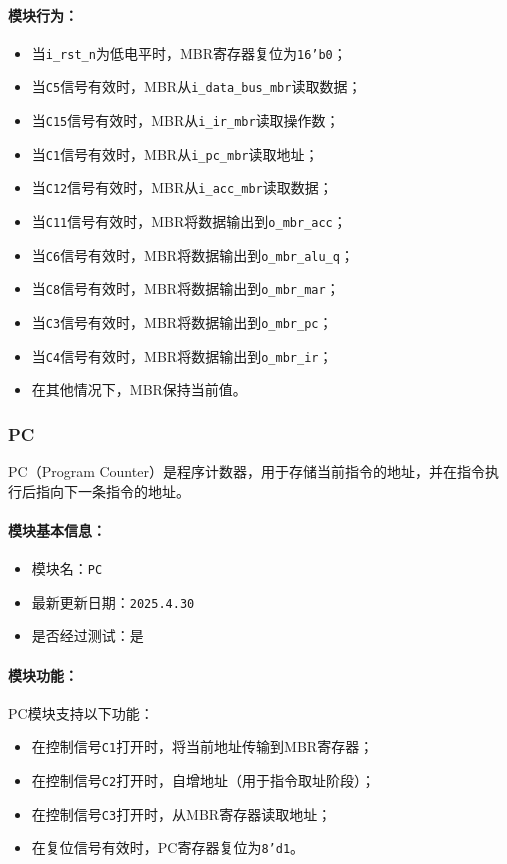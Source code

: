 \documentclass[lang=cn,a4paper,newtx]{elegantpaper}
\begin{document}
\paragraph{模块行为：}
\begin{itemize}
  \item 当\texttt{i\_rst\_n}为低电平时，MBR寄存器复位为\texttt{16'b0}；
  \item 当\texttt{C5}信号有效时，MBR从\texttt{i\_data\_bus\_mbr}读取数据；
  \item 当\texttt{C15}信号有效时，MBR从\texttt{i\_ir\_mbr}读取操作数；
  \item 当\texttt{C1}信号有效时，MBR从\texttt{i\_pc\_mbr}读取地址；
  \item 当\texttt{C12}信号有效时，MBR从\texttt{i\_acc\_mbr}读取数据；
  \item 当\texttt{C11}信号有效时，MBR将数据输出到\texttt{o\_mbr\_acc}；
  \item 当\texttt{C6}信号有效时，MBR将数据输出到\texttt{o\_mbr\_alu\_q}；
  \item 当\texttt{C8}信号有效时，MBR将数据输出到\texttt{o\_mbr\_mar}；
  \item 当\texttt{C3}信号有效时，MBR将数据输出到\texttt{o\_mbr\_pc}；
  \item 当\texttt{C4}信号有效时，MBR将数据输出到\texttt{o\_mbr\_ir}；
  \item 在其他情况下，MBR保持当前值。
\end{itemize}
\subsubsection{PC}
PC（Program Counter）是程序计数器，用于存储当前指令的地址，并在指令执行后指向下一条指令的地址。

\paragraph{模块基本信息：}
\begin{itemize}
  \item 模块名：\texttt{PC}
  \item 最新更新日期：\texttt{2025.4.30}
  \item 是否经过测试：是
\end{itemize}

\paragraph{模块功能：}
PC模块支持以下功能：
\begin{itemize}
  \item 在控制信号\texttt{C1}打开时，将当前地址传输到MBR寄存器；
  \item 在控制信号\texttt{C2}打开时，自增地址（用于指令取址阶段）；
  \item 在控制信号\texttt{C3}打开时，从MBR寄存器读取地址；
  \item 在复位信号有效时，PC寄存器复位为\texttt{8'd1}。
\end{itemize}
\end{document}
